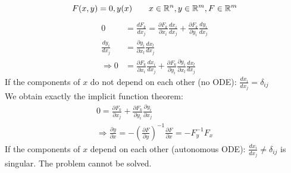 \begin{equation*}
	F(x,y) = 0, y(x) \qquad x\in\mathbb{R}^n, y\in\mathbb{R}^m,F\in\mathbb{R}^m\\
\end{equation*}
\begin{align}
	0 &= \frac{dF_k}{dx_j} = \frac{\partial F_k}{\partial x_i}\frac{dx_i}{dx_j} + \frac{\partial F_k}{\partial y_i}\frac{dy_i}{dx_j} \\
	\frac{dy_i}{dx_j} &= \frac{\partial y_i}{\partial x_l}\frac{dx_l}{dx_j} \\
	\Rightarrow 0 &= \frac{\partial F_k}{\partial x_i}\frac{dx_i}{dx_j} + \frac{\partial F_k}{\partial y_i}\frac{\partial y_i}{\partial x_l}\frac{dx_l}{dx_j}
\end{align}
If the components of $x$ do not depend on each other (no ODE): $\frac{dx_i}{dx_j} = \delta_{ij}$ \\
We obtain exactly the implicit function theorem:
\begin{align}
	0 = \frac{\partial F_k}{\partial x_j} + \frac{\partial F_k}{\partial y_i}\frac{\partial y_i}{\partial x_j} \\
	\Rightarrow \frac{\partial y}{\partial x} = -\left(\frac{\partial F}{\partial y}\right)^{-1}\frac{\partial F}{\partial x} = -F_y^{-1}F_x
\end{align}
If the components of $x$ depend on each other (autonomous ODE): $\frac{dx_i}{dx_j} \neq \delta_{ij}$ is singular. The problem cannot be solved. \\

